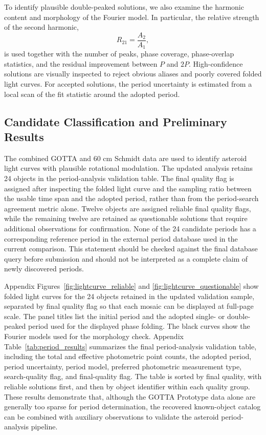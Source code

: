 \documentclass[referee]{raa}
\begin{document}
To identify plausible double-peaked solutions, we also examine the harmonic content and morphology of the Fourier model. In particular, the relative strength of the second harmonic,
\begin{equation}
R_{21}=\frac{A_2}{A_1},
\end{equation}
is used together with the number of peaks, phase coverage, phase-overlap statistics, and the residual improvement between \(P\) and \(2P\). High-confidence solutions are visually inspected to reject obvious aliases and poorly covered folded light curves. For accepted solutions, the period uncertainty is estimated from a local scan of the fit statistic around the adopted period.

\subsection{Candidate Classification and Preliminary Results}

The combined GOTTA and 60 cm Schmidt data are used to identify asteroid light curves with plausible rotational modulation. The updated analysis retains 24 objects in the period-analysis validation table. The final quality flag is assigned after inspecting the folded light curve and the sampling ratio between the usable time span and the adopted period, rather than from the period-search agreement metric alone. Twelve objects are assigned reliable final quality flags, while the remaining twelve are retained as questionable solutions that require additional observations for confirmation. None of the 24 candidate periods has a corresponding reference period in the external period database used in the current comparison. This statement should be checked against the final database query before submission and should not be interpreted as a complete claim of newly discovered periods.

Appendix Figures~\ref{fig:lightcurve_reliable} and \ref{fig:lightcurve_questionable} show folded light curves for the 24 objects retained in the updated validation sample, separated by final quality flag so that each mosaic can be displayed at full-page scale. The panel titles list the initial period and the adopted single- or double-peaked period used for the displayed phase folding. The black curves show the Fourier models used for the morphology check. Appendix Table~\ref{tab:period_results} summarizes the final period-analysis validation table, including the total and effective photometric point counts, the adopted period, period uncertainty, period model, preferred photometric measurement type, search-quality flag, and final-quality flag. The table is sorted by final quality, with reliable solutions first, and then by object identifier within each quality group. These results demonstrate that, although the GOTTA Prototype data alone are generally too sparse for period determination, the recovered known-object catalog can be combined with auxiliary observations to validate the asteroid period-analysis pipeline.
\end{document}
